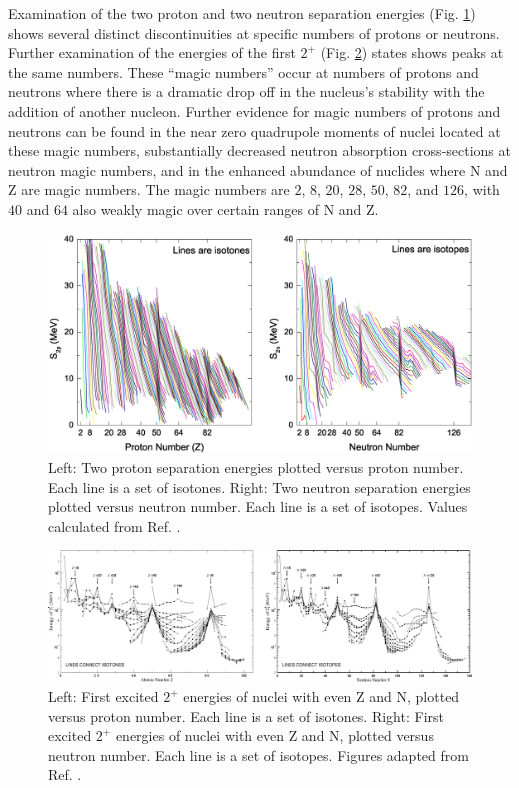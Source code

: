 Examination of the two proton and two neutron separation energies (Fig. \ref{fig:chp2-masses}) shows several distinct discontinuities at specific numbers of protons or neutrons. Further examination of the energies of the first $2^+$ (Fig. \ref{fig:chp2-two-plus-energies}) states shows peaks at the same numbers. These ``magic numbers'' occur at numbers of protons and neutrons where there is a dramatic drop off in the nucleus's stability with the addition of another nucleon. Further evidence for magic numbers of protons and neutrons can be found in the near zero quadrupole moments of nuclei located at these magic numbers, substantially decreased neutron absorption cross-sections at neutron magic numbers, and in the enhanced abundance of nuclides where N and Z are magic numbers. The magic numbers are $2$, $8$, $20$, $28$, $50$, $82$, and $126$, with $40$ and $64$ also weakly magic over certain ranges of N and Z.

\begin{figure}[h!]
\centerline{\includegraphics[width=\textwidth]{./img/c2/2nuc_sep_en.eps}}
	\caption{Left: Two proton separation energies plotted versus proton number. Each line is a set of isotones. Right: Two neutron separation energies plotted versus neutron number. Each line is a set of isotopes. Values calculated from Ref. \cite{AME20031,AME20032}.\label{fig:chp2-masses}}
\end{figure}

\begin{figure}[h!]
\centerline{\includegraphics[width=\textwidth]{./img/c2/2_plus_en.eps}}
	\caption{Left: First excited $2^+$ energies of nuclei with even Z and N, plotted versus proton number. Each line is a set of isotones. Right: First excited $2^+$ energies of nuclei with even Z and N, plotted versus neutron number. Each line is a set of isotopes. Figures adapted from Ref. \cite{RamanTwoPlus}.\label{fig:chp2-two-plus-energies}}
\end{figure}

